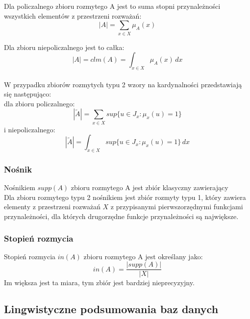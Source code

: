 \documentclass{classrep}
\begin{document}
Dla policzalnego zbioru rozmytego A jest to suma stopni przynależności wszystkich elementów z przestrzeni rozważań:
\begin{equation}
|A|=\sum_{x \in X} \mu_A(x)
\end{equation}

Dla zbioru niepoliczalnego jest to całka:
\begin{equation}
|A|=clm(A)=\int_{x \in X} \mu_A(x)\,dx
\end{equation}
\\

W przypadku zbiorów rozmytych typu 2 wzory na kardynalności przedstawiają się następująco:
\\
dla zbioru policzalnego:
\begin{equation}
|\tilde{A}|=\sum_{x \in X} sup\{u \in J_x:\mu_x(u)=1\}
\end{equation}
i niepoliczalnego:
\begin{equation}
|\tilde{A}|=\int_{x \in X} sup\{u \in J_x:\mu_x(u)=1\}\,dx
\end{equation}

\subsubsection{Nośnik}
Nośnikiem $supp(A)$ zbioru rozmytego A jest zbiór klasyczny zawierający  
\\

Dla zbioru rozmytego typu 2 nośnikiem jest zbiór rozmyty typu 1, który zawiera elementy z przestrzeni rozważań $X$ z przypisanymi pierwszorzędnymi funkcjami przynależności, dla których drugorzędne funkcje przynależności są największe.

\subsubsection{Stopień rozmycia}
Stopień rozmycia $in(A)$ zbioru rozmytego A jest określany jako:
\begin{equation}
in(A)=\frac{|supp(A)|}{|X|}
\end{equation}
Im większa jest ta miara, tym zbiór jest bardziej nieprecyzyjny.

\subsection{Lingwistyczne podsumowania baz danych}
\end{document}
